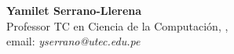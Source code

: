 \noindent \textbf{Yamilet Serrano-Llerena}\\ 
Professor TC en Ciencia de la Computación, \University, \city\\
email: \textit{yserrano@utec.edu.pe}\\

